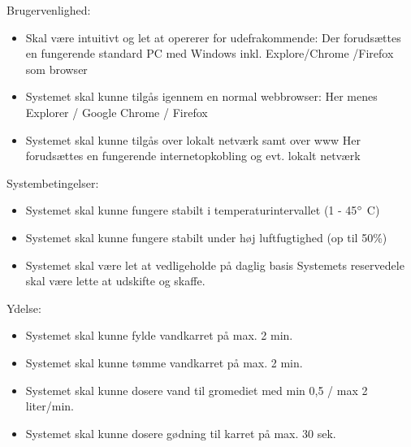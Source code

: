 Brugervenlighed:
\begin{itemize}
	\item Skal være intuitivt og let at opererer for udefrakommende:
	Der forudsættes en fungerende standard PC med Windows inkl. Explore/Chrome	/Firefox som browser

	\item Systemet skal kunne tilgås igennem en normal webbrowser:
		Her menes Explorer / Google Chrome / Firefox
	\item Systemet skal kunne tilgås over lokalt netværk samt over www
		Her forudsættes en fungerende internetopkobling og evt. lokalt netværk
\end{itemize}

Systembetingelser:
\begin{itemize}
	\item Systemet skal kunne fungere stabilt i temperaturintervallet (1 - 45$\degree$ C)
	\item Systemet skal kunne fungere stabilt under høj luftfugtighed (op til 50\%)
	\item Systemet skal være let at vedligeholde på daglig basis
		Systemets reservedele skal være lette at udskifte og skaffe.
\end{itemize}


Ydelse:
\begin{itemize}
	\item Systemet skal kunne fylde vandkarret på max. 2 min.
	\item Systemet skal kunne tømme vandkarret på max. 2 min.
	\item Systemet skal kunne dosere vand til gromediet med min 0,5 / max 2 liter/min.
	\item Systemet skal kunne dosere gødning til karret på max. 30 sek.
\end{itemize}
